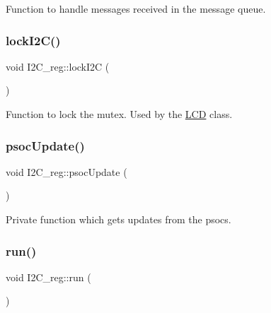 Function to handle messages received in the message queue. 

\mbox{\label{class_i2_c__reg_abf7f9d0cb3ba7f175f88521c6c865ce9}} 
\subsubsection{\texorpdfstring{lock\+I2\+C()}{lockI2C()}}
{\footnotesize\ttfamily void I2\+C\+\_\+reg\+::lock\+I2C (\begin{DoxyParamCaption}{ }\end{DoxyParamCaption})}



Function to lock the mutex. Used by the \hyperlink{class_l_c_d}{L\+CD} class. 

\mbox{\label{class_i2_c__reg_a55154e2f02004d6485c32a9e5f1b2d61}} 
\subsubsection{\texorpdfstring{psoc\+Update()}{psocUpdate()}}
{\footnotesize\ttfamily void I2\+C\+\_\+reg\+::psoc\+Update (\begin{DoxyParamCaption}{ }\end{DoxyParamCaption})\hspace{0.3cm}{\ttfamily [private]}}



Private function which gets updates from the psocs. 

\mbox{\label{class_i2_c__reg_abc05f4c53d60cb63152b9fbdc0c38c23}} 
\subsubsection{\texorpdfstring{run()}{run()}}
{\footnotesize\ttfamily void I2\+C\+\_\+reg\+::run (\begin{DoxyParamCaption}{ }\end{DoxyParamCaption})\hspace{0.3cm}{\ttfamily [private]}}



